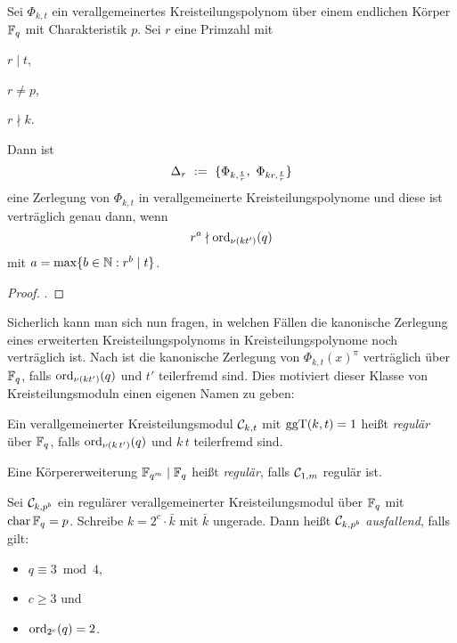 \begin{satz}
  \label{satz:zerlegungssatz}
  Sei $\Phi_{k,t}$ ein verallgemeinertes Kreisteilungspolynom über einem
  endlichen Körper $\mathbb{F}_q$ mit Charakteristik $p$. Sei $r$ eine Primzahl
  mit

  \begin{itemize*}[itemjoin={\qquad}]
    \item $r \mid t$,
    \item $r \neq p$,
    \item $r \nmid k$.
  \end{itemize*}

  Dann ist 
  \[ \Delta_r \ :=\  \{ \Phi_{k,\frac{t}{r}},\ \Phi_{kr, \frac{t}{r}}\}\]
  eine Zerlegung von $\Phi_{k,t}$ in verallgemeinerte Kreisteilungspolynome und
  diese ist verträglich genau dann, wenn
  \[ r^a \nmid \operatorname{ord}_{\nu(kt')}(q) \]
  mit $a = \max\{ b\in \mathbb{N}: r^b \mid t\}$.
\end{satz}
\begin{proof}
  \autocite[Decomposition Theorem, Section 19]{hachenberger1997finite}.
\end{proof}


Sicherlich kann man sich nun fragen, in welchen Fällen die kanonische Zerlegung
eines erweiterten Kreisteilungspolynoms in Kreisteilungspolynome noch
verträglich ist. Nach \autocite[Theorem 19.10]{hachenberger1997finite} 
ist die kanonische Zerlegung von $\Phi_{k,t}(x)^\pi$ verträglich über 
$\mathbb{F}_q$, falls $\operatorname{ord}_{\nu(kt')}(q)$ und $t'$ teilerfremd sind. Dies motiviert
dieser Klasse von Kreisteilungsmoduln einen eigenen Namen zu geben:

\begin{definition}[regulär]
  \label{def:regulaer}
  Ein verallgemeinerter Kreisteilungsmodul $\mathcal{C}_{k,t}$ 
  mit $\operatorname{ggT}(k,t)=1$ heißt \emph{regulär} über $\mathbb{F}_q$,
  falls $\operatorname{ord}_{\nu(k\,t')}(q)$ und $k\,t$ teilerfremd sind.

  Eine Körpererweiterung $\mathbb{F}_{q^m} \mid \mathbb{F}_q$ heißt \emph{regulär}, falls
  $\mathcal{C}_{1,m}$ regulär ist.
\end{definition}


\begin{definition}[ausfallend]
  \label{def:ausfallend}
  Sei $\mathcal{C}_{k, p^b}$ ein regulärer verallgemeinerter Kreisteilungsmodul 
  über $\mathbb{F}_q$ mit $\operatorname{char} \mathbb{F}_q = p$. Schreibe $k = 2^c \cdot \bar k$ mit $\bar
  k$ ungerade. Dann heißt $\mathcal{C}_{k,p^b}$ \emph{ausfallend}, falls gilt:
  \begin{itemize}
    \item $q \equiv 3 \bmod 4$,
    \item $c \geq 3$ und 
    \item $\operatorname{ord}_{2^c}(q) = 2$.
  \end{itemize}
\end{definition}



